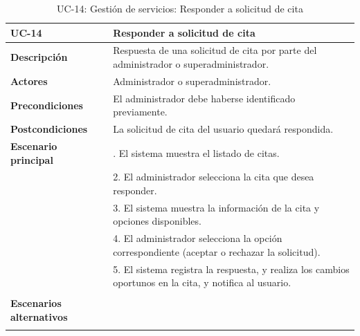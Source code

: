 \begin{table}[H]
  \begin{center}
    \begin{tabularx}{16.4cm}{|l|X|}
      \hline
      \textbf{UC-14} & \textbf{Responder a solicitud de cita}\\
      \hline
      \textbf{Descripción} & Respuesta de una solicitud de cita por parte del administrador o superadministrador. \\
      \hline
      \textbf{Actores} & Administrador o superadministrador.\\
      \hline
      \textbf{Precondiciones} & El administrador debe haberse identificado previamente.\\
      \hline
      \textbf{Postcondiciones} & La solicitud de cita del usuario quedará respondida.\\
      \hline
      \textbf{Escenario principal} & \smallskip 1. El sistema muestra el listado de citas.\\
      & 2. El administrador selecciona la cita que desea responder.\\
      & 3. El sistema muestra la información de la cita y opciones disponibles.\\
      & 4. El administrador selecciona la opción correspondiente (aceptar o rechazar la solicitud).\\
      & 5. El sistema registra la respuesta, y realiza los cambios oportunos en la cita, y notifica al usuario.\\
      & \\
      \hline
      \textbf{Escenarios alternativos} & \\
      & \\
      \hline
    \end{tabularx}
    \caption{UC-14: Gestión de servicios: Responder a solicitud de cita}
    \label{tab:CU-responder-solicitud-cita}
  \end{center}
\end{table}


